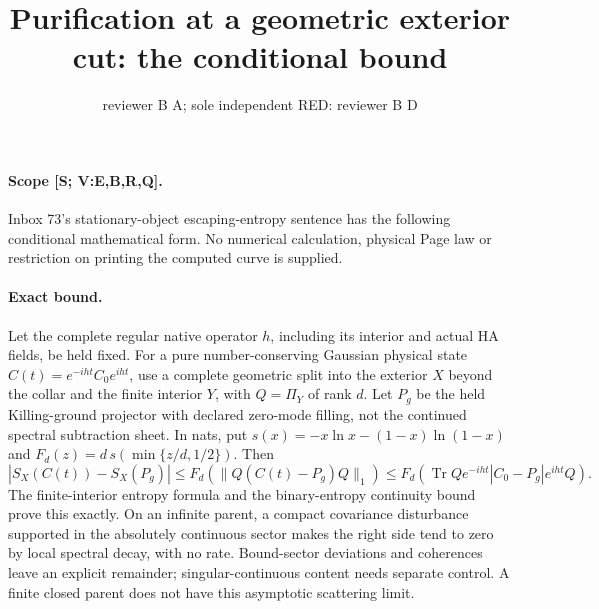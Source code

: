 \documentclass[11pt]{article}
\title{Purification at a geometric exterior cut: the conditional bound}
\author{reviewer B A; sole independent RED: reviewer B D}
\date{}
\newcommand{\Tr}{\operatorname{Tr}}
\begin{document}
\maketitle

\paragraph{Scope [S; V:E,B,R,Q].}
Inbox 73's stationary-object escaping-entropy sentence has the following
conditional mathematical form.  No numerical calculation, physical
Page law or restriction on printing the computed curve is supplied.

\paragraph{Exact bound.}
Let the complete regular native operator \(h\), including its interior
and actual HA fields, be held fixed.  For a pure number-conserving
Gaussian physical state \(C(t)=e^{-iht}C_0e^{iht}\), use a complete
geometric split into the exterior \(X\) beyond the collar and the
finite interior \(Y\), with \(Q=\Pi_Y\) of rank \(d\).
Let \(P_g\) be the held Killing-ground projector with declared
zero-mode filling, not the continued spectral subtraction sheet.
In nats, put \(s(x)=-x\ln x-(1-x)\ln(1-x)\) and
\(F_d(z)=d\,s(\min\{z/d,1/2\})\).  Then
\[
 \left|S_X(C(t))-S_X(P_g)\right|
 \le F_d\!\left(\|Q(C(t)-P_g)Q\|_1\right)
 \le F_d\!\left(\Tr Qe^{-iht}|C_0-P_g|e^{iht}Q\right).
\]
The finite-interior entropy formula and the binary-entropy continuity
bound prove this exactly.  On an infinite parent, a compact covariance
disturbance supported in the absolutely continuous sector makes the
right side tend to zero by local spectral decay, with no rate.
Bound-sector deviations and coherences leave an explicit remainder;
singular-continuous content needs separate control.  A finite closed
parent does not have this asymptotic scattering limit.
\end{document}
